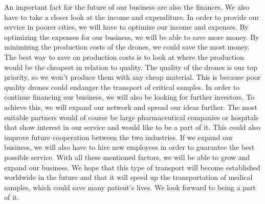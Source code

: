 An important fact for the future of our business are also the finances. We also have to take a closer look at the income and expenditure. In order to provide our service in poorer cities, we will have to optimize our income and expenses. By optimizing the expenses for our business, we will be able to save more money. By minimizing the production costs of the drones, we could save the most money. The best way to save on production costs is to look at where the production would be the cheapest in relation to quality. The quality of the drones is our top priority, so we won't produce them with any cheap material. This is because poor quality drones could endanger the transport of critical samples. In order to continue financing our business, we will also be looking for further investors. To achieve this, we will expand our network and spread our ideas further. The most suitable partners would of course be large pharmaceutical companies or hospitals that show interest in our service and would like to be a part of it. This could also improve future cooperation between the two industries. If we expand our business, we will also have to hire new employees in order to guarantee the best possible service.
\newline
With all these mentioned factors, we will be able to grow and expand our business. We hope that this type of transport will become established worldwide in the future and that it will speed up the transportation of medical samples, which could save many patient's lives. We look forward to being a part of it.
